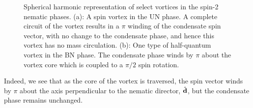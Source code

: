 \begin{figure}
    \centering
    \caption[Spherical harmonic representation of spin-2 vortices]
    {\label{fig: SV-HQV}Spherical harmonic representation of select vortices
    in the spin-2 nematic phases.
    (a): A spin vortex in the UN phase. A complete circuit of the vortex
    results in a \(\pi \) winding of the condensate spin vector, with no
    change to the condensate phase, and hence this vortex has no mass
    circulation.
    (b): One type of half-quantum vortex in the BN phase.
    The condensate phase winds by \(\pi \) about the vortex core which is
    coupled to a \(\pi / 2\) spin rotation.}
\end{figure}
Indeed, we see that as the core of the vortex is traversed, the spin vector
winds by \(\pi \) about the axis perpendicular to the nematic director,
\(\hat{\vb{d}}\), but the condensate phase remains unchanged.

